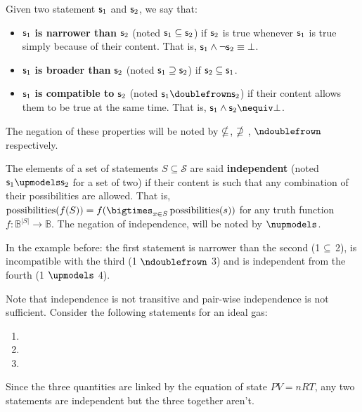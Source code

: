 \documentclass[11pt,letterpaper,fleqn]{memoir} %
\begin{document}
\begin{mathSection}

\begin{defn}
	Given two statement $\mathsf{s}_1$ and $\mathsf{s}_2$, we say that:
	\begin{itemize}
		\item $\mathsf{s}_1$ \textbf{is narrower than} $\mathsf{s}_2$ (noted $\mathsf{s}_1 \subseteq \mathsf{s}_2$) if $\mathsf{s}_2$ is true whenever $\mathsf{s}_1$ is true simply because of their content. That is, $\mathsf{s}_1 \wedge \neg \mathsf{s}_2 \equiv \bot$.
		\item $\mathsf{s}_1$ \textbf{is broader than} $\mathsf{s}_2$ (noted $\mathsf{s}_1 \supseteq \mathsf{s}_2$) if $\mathsf{s}_2 \subseteq \mathsf{s}_1$.
		\item $\mathsf{s}_1$ \textbf{is compatible to} $\mathsf{s}_2$ (noted $\stmt{s}_1 \comp \stmt{s}_2$) if their content allows them to be true at the same time. That is, $\stmt{s}_1 \AND \stmt{s}_2 \nequiv \contradiction$.

	\end{itemize}
	The negation of these properties will be noted by $\nsubseteq$, $\nsupseteq$ , $\ncomp$ respectively.
\end{defn}
\begin{defn}
	The elements of a set of statements $S \subseteq \mathcal{S}$ are said \textbf{independent} (noted $\stmt{s}_1 \indep \stmt{s}_2$ for a set of two) if their content is such that any combination of their possibilities are allowed. That is, $\poss(f(S)) = f(\bigtimes_{x \in S} \poss(s))$ for any truth function $f : \mathbb{B}^{|S|} \to \mathbb{B}$. The negation of independence, will be noted by $\nindep$.
\end{defn}

\end{mathSection}

In the example before: the first statement is narrower than the second (1 $\subseteq$ 2), is incompatible with the third (1 $\ncomp$ 3) and is independent from the fourth (1 $\indep$ 4).

Note that independence is not transitive and pair-wise independence is not sufficient. Consider the following statements for an ideal gas:
\begin{enumerate}
	\item {}
	\item {}
	\item {}
\end{enumerate}
Since the three quantities are linked by the equation of state $PV=nRT$, any two statements are independent but the three together aren't.
\end{document}
